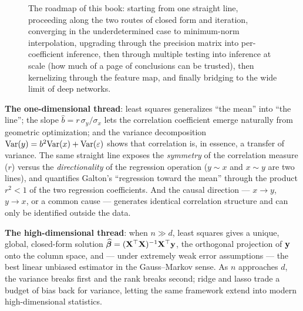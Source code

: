 \begin{figure}[htbp]
{%
  }
  \caption{The roadmap of this book: starting from one straight line, proceeding along the two routes of closed form and iteration, converging in the underdetermined case to minimum-norm interpolation, upgrading through the precision matrix into per-coefficient inference, then through multiple testing into inference at scale (how much of a page of conclusions can be trusted), then kernelizing through the feature map, and finally bridging to the wide limit of deep networks.}
  \label{fig:ch8-roadmap}
\end{figure}

\textbf{The one-dimensional thread}: least squares generalizes ``the mean'' into ``the line''; the slope $\hat{b} = r\,\sigma_y/\sigma_x$ lets the correlation coefficient emerge naturally from geometric optimization; and the variance decomposition $\mathrm{Var}(y) = b^2\mathrm{Var}(x) + \mathrm{Var}(\varepsilon)$ shows that correlation is, in essence, a transfer of variance. The same straight line exposes the \textit{symmetry} of the correlation measure ($r$) versus the \textit{directionality} of the regression operation ($y \sim x$ and $x \sim y$ are two lines), and quantifies Galton's ``regression toward the mean'' through the product $r^2 < 1$ of the two regression coefficients. And the causal direction --- $x \to y$, $y \to x$, or a common cause --- generates identical correlation structure and can only be identified outside the data\cite{wright1921,reichenbach1956}.

\textbf{The high-dimensional thread}: when $n \gg d$, least squares gives a unique, global, closed-form solution $\widehat{\bm{\beta}} = (\mathbf{X}^\top\mathbf{X})^{-1}\mathbf{X}^\top\mathbf{y}$, the orthogonal projection of $\mathbf{y}$ onto the column space, and --- under extremely weak error assumptions --- the best linear unbiased estimator in the Gauss--Markov sense\cite{gauss1823}. As $n$ approaches $d$, the variance breaks first and the rank breaks second; ridge and lasso trade a budget of bias back for variance, letting the same framework extend into modern high-dimensional statistics\cite{hoerl1970,tibshirani1996}.

